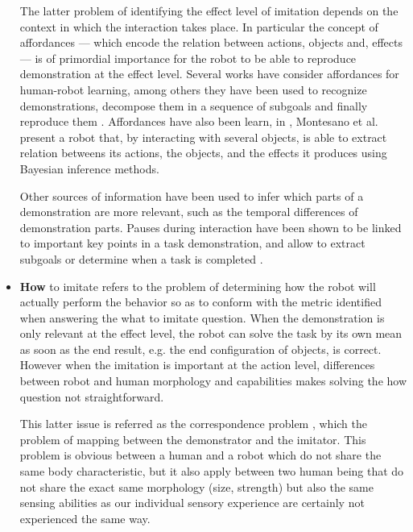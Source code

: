 \begin{itemize}
The latter problem of identifying the effect level of imitation depends on the context in which the interaction takes place. In particular the concept of affordances \cite{gibson1986ecological} --- which encode the relation between actions, objects and, effects --- is of primordial importance for the robot to be able to reproduce demonstration at the effect level. Several works have consider affordances for human-robot learning, among others they have been used to recognize demonstrations, decompose them in a sequence of subgoals and finally reproduce them \cite{macl07affimit}. Affordances have also been learn, in \cite{montesano2008learning}, Montesano et al. present a robot that, by interacting with several objects, is able to extract relation betweens its actions, the objects, and the effects it produces using Bayesian inference methods. 

Other sources of information have been used to infer which parts of a demonstration are more relevant, such as the temporal differences of demonstration parts. Pauses during interaction have been shown to be linked to important key points in a task demonstration, and allow to extract subgoals or determine when a task is completed \cite{theofilis2013temporal}.

\item \textbf{How} to imitate refers to the problem of determining how the robot will actually perform the behavior so as to conform with the metric identified when answering the what to imitate question. When the demonstration is only relevant at the effect level, the robot can solve the task by its own mean as soon as the end result, e.g. the end configuration of objects, is correct. However when the imitation is important at the action level, differences between robot and human morphology and capabilities makes solving the how question not straightforward.

This latter issue is referred as the correspondence problem \cite{nehaniv2002correspondence}, which the problem of mapping between the demonstrator and the imitator. This problem is obvious between a human and a robot which do not share the same body characteristic, but it also apply between two human being that do not share the exact same morphology (size, strength) but also the same sensing abilities as our individual sensory experience are certainly not experienced the same way.


\end{itemize}
